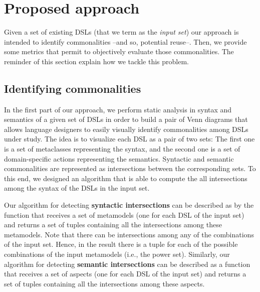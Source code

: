 \section{Proposed approach}
\label{sec:apprach}

Given a set of existing DSLs (that we term as the \textit{input set}) our approach is intended to identify commonalities --and so, potential reuse--. Then, we provide some metrics that permit to objectively evaluate those commonalities. The reminder of this section explain how we tackle this problem.

\subsection{Identifying commonalities}
\label{sec:metrics}

In the first part of our approach, we perform static analysis in syntax and semantics of a given set of DSLs in order to build a pair of Venn diagrams that allows language designers to easily visually identify commonalities among DSLs under study. The idea is to visualize each DSL as a pair of two sets: The first one is a set of metaclasses representing the syntax, and the second one is a set of domain-specific actions representing the semantics. Syntactic and semantic commonalities are represented as intersections between the corresponding sets. To this end, we designed an algorithm that is able to compute the all intersections among the syntax of the DSLs in the input set. 

Our algorithm for detecting \textbf{syntactic intersections} can be described as by the function that receives a set of metamodels (one for each DSL of the input set) and returns a set of tuples containing all the intersections among these metamodels. Note that there can be intersections among any of the combinations of the input set. Hence, in the result there is a tuple for each of the possible combinations of the input metamodels (i.e., the power set). Similarly, our algorithm for detecting \textbf{semantic intersections} can be described as a function that receives a set of aspects (one for each DSL of the input set) and returns a set of tuples containing all the intersections among these aspects. 



